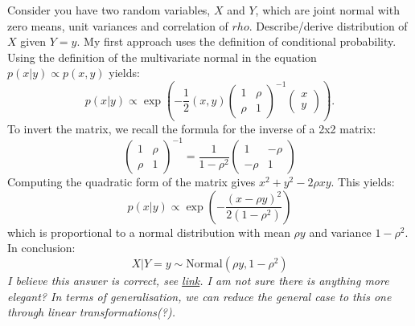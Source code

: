 \begin{qanda}
    \Q Consider you have two random variables, $X$ and $Y$, which are joint normal with zero means, unit variances and correlation of $rho$. Describe/derive distribution of $X$ given $Y = y$.
    \A My first approach uses the definition of conditional probability.
    Using the definition of the multivariate normal in the equation $p(x|y) \propto p(x,y)$ yields:
    \begin{equation*} 
        p(x | y) \propto \exp \left(  -\frac{1}{2} (x, y)  
            \begin{pmatrix} 1 &  \rho\\ \rho & 1 \end{pmatrix}^{-1}
            \begin{pmatrix} x \\ y \end{pmatrix} 
        \right).
        \end{equation*}
        To invert the matrix, we recall the formula for the inverse of a 2x2 matrix:
        \begin{equation*}
            \begin{pmatrix} 1 & \rho \\ \rho & 1 \end{pmatrix}^{-1} = 
            \frac{1}{1 - \rho^2}
            \begin{pmatrix} 1 & -\rho  \\ -\rho& 1 \end{pmatrix}
        \end{equation*}
        Computing the quadratic form of the matrix gives $x^2 + y^2 - 2 \rho x y$.
        This yields:
        \begin{equation*}
            p(x | y) \propto \exp \left(  
                -\frac{(x - \rho y)^2}{2(1-\rho^2)} 
            \right)
        \end{equation*}
        which is proportional to a normal distribution with mean $\rho y$ and variance $1 - \rho^2$.  In conclusion:
        \begin{equation*}
            X | Y = y \sim \text{Normal}(\rho y, 1 - \rho^2)
        \end{equation*}
        \emph{I believe this answer is correct, see \href{https://online.stat.psu.edu/stat414/lesson/21/21.1}{link}. I am not sure there is anything more elegant? In terms of generalisation, we can reduce the general case to this one through linear transformations(?).}
    \end{qanda}

